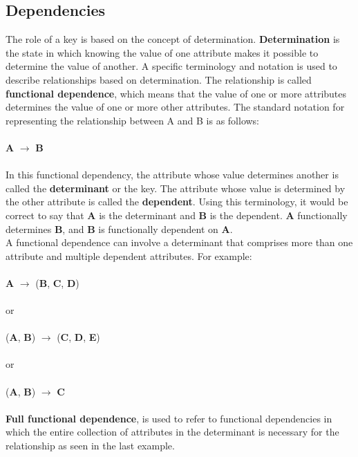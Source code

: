 \documentclass[a4paper, 12pt, titlepage]{report}
\begin{document}
\subsection{Dependencies}
The role of a key is based on the concept of determination. \textbf{Determination} is the state in which knowing the value of one attribute makes it possible to determine the value of another. A specific terminology and notation is used to describe relationships based on determination. The relationship is called \textbf{functional dependence}, which means that the value of one or more attributes determines the value of one or more other attributes. The standard notation for representing the relationship between A and B is as follows:\\ \\
\textbf{A} $\longrightarrow$ \textbf{B} \\ \\
In this functional dependency, the attribute whose value determines another is called the \textbf{determinant} or the key. The attribute whose value is determined by the other attribute is called the \textbf{dependent}. Using this terminology, it would be correct to say that \textbf{A} is the determinant and \textbf{B} is the dependent. \textbf{A} functionally determines \textbf{B}, and \textbf{B} is functionally dependent on \textbf{A}.\\
A functional dependence can involve a determinant that comprises more than one attribute and multiple dependent attributes. For example:\\ \\
\textbf{A} $\longrightarrow$ (\textbf{B}, \textbf{C}, \textbf{D}) \\ \\
or\\ \\
(\textbf{A}, \textbf{B}) $\longrightarrow$ (\textbf{C}, \textbf{D}, \textbf{E})\\ \\
or\\ \\
(\textbf{A}, \textbf{B}) $\longrightarrow$ \textbf{C}\\ \\
\textbf{Full functional dependence}, is used to refer to functional dependencies in which the entire collection of attributes in the determinant is necessary for the relationship as seen in the last example.
\end{document}
